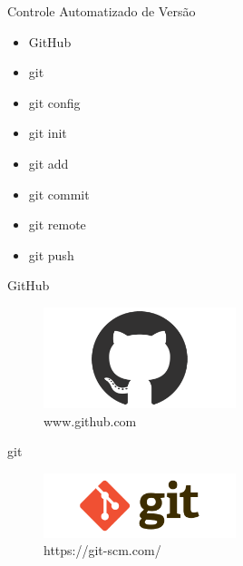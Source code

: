\begin{frame}{Controle Automatizado de Versão}
	\begin{itemize}
		\item GitHub
        \item git
        \item git config
		\item git init
		\item git add 
		\item git commit
		\item git remote
		\item git push
	\end{itemize}
\end{frame}
\begin{frame}{GitHub}
    \begin{center}
        \begin{figure}[h]
            \includegraphics[width=0.5\textwidth]{imagens/github.png}
            \caption{www.github.com}
        \end{figure}
	\end{center}
\end{frame}
\begin{frame}{git}
    \begin{center}
        \begin{figure}[h]
            \includegraphics[width=0.5\textwidth]{imagens/git.png}
            \caption{https://git-scm.com/}
        \end{figure}
	\end{center}
\end{frame}
